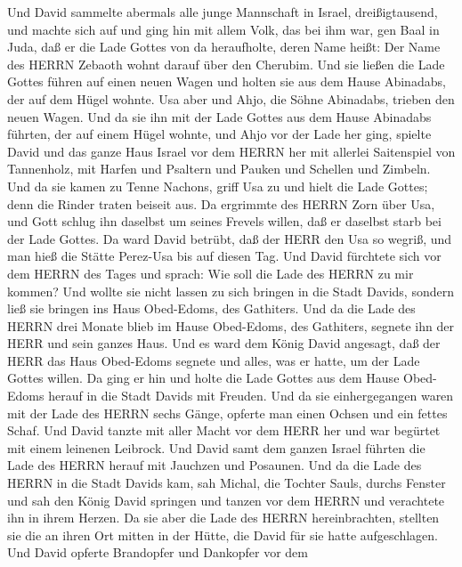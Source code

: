  Und David sammelte abermals alle junge Mannschaft in
Israel, dreißigtausend,  und machte sich auf und ging hin
mit allem Volk, das bei ihm war, gen Baal in Juda, daß er die Lade
Gottes von da heraufholte, deren Name heißt: Der Name des HERRN Zebaoth
wohnt darauf über den Cherubim.  Und sie ließen die Lade
Gottes führen auf einen neuen Wagen und holten sie aus dem Hause
Abinadabs, der auf dem Hügel wohnte. Usa aber und Ahjo, die Söhne
Abinadabs, trieben den neuen Wagen.  Und da sie ihn mit der
Lade Gottes aus dem Hause Abinadabs führten, der auf einem Hügel wohnte,
und Ahjo vor der Lade her ging,  spielte David und das ganze
Haus Israel vor dem HERRN her mit allerlei Saitenspiel von Tannenholz,
mit Harfen und Psaltern und Pauken und Schellen und Zimbeln.
 Und da sie kamen zu Tenne Nachons, griff Usa zu und hielt
die Lade Gottes; denn die Rinder traten beiseit aus.  Da
ergrimmte des HERRN Zorn über Usa, und Gott schlug ihn daselbst um
seines Frevels willen, daß er daselbst starb bei der Lade Gottes.
 Da ward David betrübt, daß der HERR den Usa so wegriß, und
man hieß die Stätte Perez-Usa bis auf diesen Tag.  Und David
fürchtete sich vor dem HERRN des Tages und sprach: Wie soll die Lade des
HERRN zu mir kommen?  Und wollte sie nicht lassen zu sich
bringen in die Stadt Davids, sondern ließ sie bringen ins Haus
Obed-Edoms, des Gathiters.  Und da die Lade des HERRN drei
Monate blieb im Hause Obed-Edoms, des Gathiters, segnete ihn der HERR
und sein ganzes Haus.  Und es ward dem König David
angesagt, daß der HERR das Haus Obed-Edoms segnete und alles, was er
hatte, um der Lade Gottes willen. Da ging er hin und holte die Lade
Gottes aus dem Hause Obed-Edoms herauf in die Stadt Davids mit Freuden.
 Und da sie einhergegangen waren mit der Lade des HERRN
sechs Gänge, opferte man einen Ochsen und ein fettes Schaf.
 Und David tanzte mit aller Macht vor dem HERR her und war
begürtet mit einem leinenen Leibrock.  Und David samt dem
ganzen Israel führten die Lade des HERRN herauf mit Jauchzen und
Posaunen.  Und da die Lade des HERRN in die Stadt Davids
kam, sah Michal, die Tochter Sauls, durchs Fenster und sah den König
David springen und tanzen vor dem HERRN und verachtete ihn in ihrem
Herzen.  Da sie aber die Lade des HERRN hereinbrachten,
stellten sie die an ihren Ort mitten in der Hütte, die David für sie
hatte aufgeschlagen. Und David opferte Brandopfer und Dankopfer vor dem

